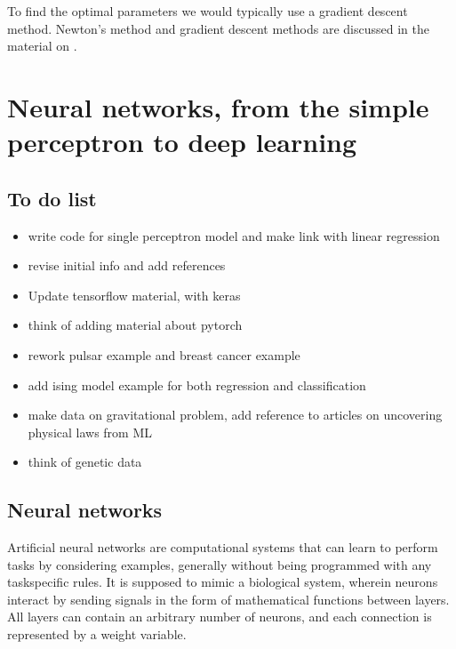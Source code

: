 \documentclass[letterpaper,10pt,english]{sphinxmanual}
\begin{document}
To find the optimal parameters we would typically use a gradient
descent method.  Newton’s method and gradient descent methods are
discussed in the material on .


\section{Neural networks, from the simple perceptron to deep learning}
\label{\detokenize{chapter6:neural-networks-from-the-simple-perceptron-to-deep-learning}}\label{\detokenize{chapter6::doc}}

\subsection{To do list}
\label{\detokenize{chapter6:to-do-list}}\begin{itemize}
\item {} 
write code for single perceptron model and make link with linear regression

\item {} 
revise initial info and add references

\item {} 
Update tensorflow material, with keras

\item {} 
think of adding material about pytorch

\item {} 
rework pulsar example and breast cancer example

\item {} 
add ising model example for both regression and classification

\item {} 
make data on gravitational problem, add reference to articles on uncovering physical laws from ML

\item {} 
think of genetic data

\end{itemize}


\subsection{Neural networks}
\label{\detokenize{chapter6:neural-networks}}
Artificial neural networks are computational systems that can learn to
perform tasks by considering examples, generally without being
programmed with any task\sphinxhyphen{}specific rules. It is supposed to mimic a
biological system, wherein neurons interact by sending signals in the
form of mathematical functions between layers. All layers can contain
an arbitrary number of neurons, and each connection is represented by
a weight variable.
\end{document}
